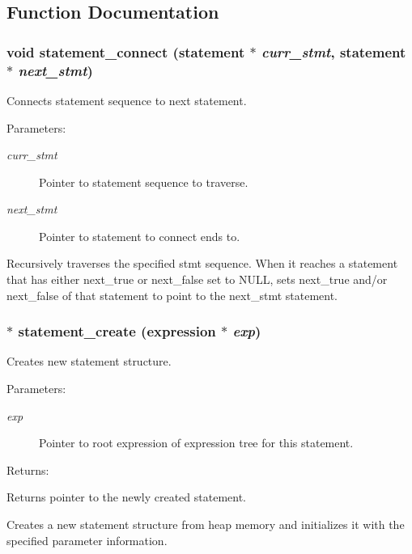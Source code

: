 \subsection{Function Documentation}
\subsubsection{\setlength{\rightskip}{0pt plus 5cm}void statement\_\-connect ({\bf statement} $\ast$ {\em curr\_\-stmt}, {\bf statement} $\ast$ {\em next\_\-stmt})}\label{statement_8c_a7}


Connects statement sequence to next statement.

\begin{Desc}
\item[Parameters: ]\par
\begin{description}
\item[{\em 
curr\_\-stmt}]Pointer to statement sequence to traverse. \item[{\em 
next\_\-stmt}]Pointer to statement to connect ends to.\end{description}
\end{Desc}
Recursively traverses the specified stmt sequence. When it reaches a statement  that has either next\_\-true or next\_\-false set to NULL, sets next\_\-true and/or  next\_\-false of that statement to point to the next\_\-stmt statement. 
\subsubsection{$\ast$ statement\_\-create ({\bf expression} $\ast$ {\em exp})}\label{statement_8c_a2}


Creates new statement structure.

\begin{Desc}
\item[Parameters: ]\par
\begin{description}
\item[{\em 
exp}]Pointer to root expression of expression tree for this statement.\end{description}
\end{Desc}
\begin{Desc}
\item[Returns: ]\par
Returns pointer to the newly created statement.\end{Desc}
Creates a new statement structure from heap memory and initializes it with the specified parameter information. 

